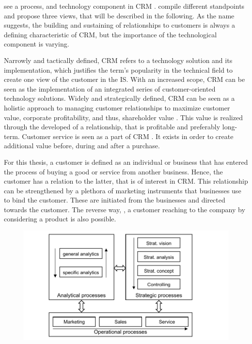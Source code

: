 		\citeauthor{Chen_2003} see a process,  and technology component in \acrshort{CRM} \citep{Chen_2003}. \cite{paynefrow2005} compile different standpoints and propose three views, that will be described in the following. As the name suggests, the building and sustaining of relationships to customers is always a defining characteristic of \acrshort{CRM}, but the importance of the technological component is varying. 
		
		Narrowly and tactically defined, \acrshort{CRM} refers to a technology solution and its implementation, which justifies the term's popularity in the technical field to create one view of the customer in the \acrshort{IS}. With an increased scope, \acrshort{CRM} can be seen as the implementation of an integrated series of customer-oriented technology solutions. Widely and strategically defined, \acrshort{CRM} can be seen as a holistic approach to managing customer relationships to maximize customer value, corporate profitability, and thus, shareholder value \citep{payne2004role}. This value is realized through the developed of a relationship, that is profitable and preferably long-term.  Customer service is seen as a part of \acrshort{CRM} \citep[]{Helmke_2012}. It exists in order to create additional value before, during and after a purchase. 
	
		For this thesis, a customer is defined as an individual or business that has entered the process of buying a good or service from another business. Hence, the customer has a relation to the latter, that is of interest in CRM. This relationship can be strengthened by a plethora of marketing instruments that businesses use to bind the customer. These are initiated from the businesses and directed towards the customer. The reverse way, \ie, a customer reaching to the company by considering a product is also possible. 
		
			\begin{figure}[caption={CRM Processes}, label={fig:crmprocessfr}]
			{	\includegraphics[width=.8\textwidth]{figures/crmprocessfr.pdf}	
	\\
						 \parbox{0.53\textwidth}{}
			 } 

		\end{figure}
	
